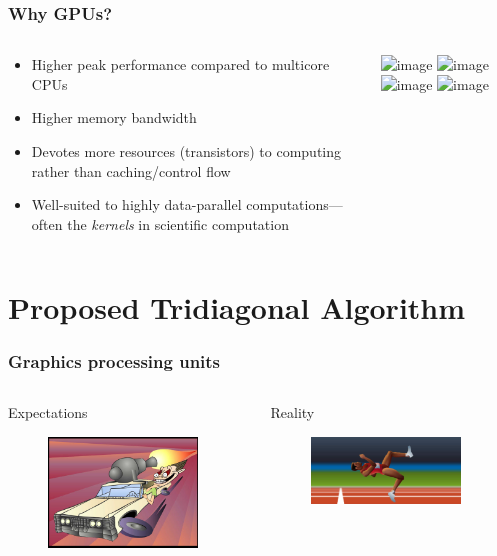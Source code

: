 \documentclass[10pt]{beamer}
\begin{document}
\begin{frame}[t]
\frametitle{Why GPUs?}
\pause
\footnotesize
\begin{columns}[T]
\begin{column}{0.4\textwidth}
\begin{itemize}
    \item<2-> Higher peak performance
        compared to multicore CPUs
    \item<3-> Higher memory bandwidth
    \item<4-> Devotes more resources
        (transistors) to computing
        rather than caching/control flow
    \item<5-> Well-suited to
        highly data-parallel computations---often the
        \emph{kernels} in scientific computation
\end{itemize}
\end{column}

\begin{column}{0.6\textwidth}
\includegraphics<2>[width=180px]
    {img/floating-point-operations-per-second.png}
\includegraphics<3>[width=180px]
    {img/memory-bandwidth.png}
\includegraphics<4>[width=180px]
    {img/device-comparison.png}
\includegraphics<5>[width=180px]
    {img/device-comparison.png}
\end{column}
\end{columns}
\end{frame}


\section{Proposed Tridiagonal Algorithm}
\begin{frame}
\frametitle{Graphics processing units}
\begin{columns}[c]
\begin{column}[T]{5cm}
    Expectations
    \begin{figure}
    \includegraphics[width=150px]{img/expectations.jpg}
    \end{figure}
\end{column}

\begin{column}[T]{5cm}
    Reality
    \begin{figure}
    \includegraphics[width=150px]{img/reality.png}
    \end{figure}
\end{column}
\end{columns}
\end{frame}
\end{document}
